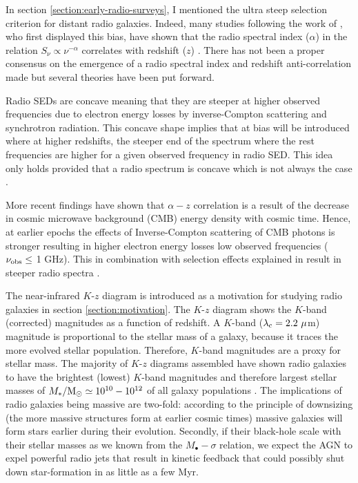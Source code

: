 \documentclass[10pt,a4paper]{article}
\begin{document}
In section \ref{section:early-radio-surveys}, I mentioned the ultra steep selection criterion for distant radio galaxies. Indeed, many studies following the work of \citet{Tielens1979}, who first displayed this bias, have shown that the radio spectral index ($\alpha$) in the relation $S_\nu \propto \nu^{-\alpha}$ correlates with redshift ($z$) \citep{BlumenthalMiley1979,Chambers1988a,deBreuck2002}. There has not been a proper consensus on the emergence of a radio spectral index and redshift anti-correlation made but several theories have been put forward. 

Radio SEDs are concave meaning that they are steeper at higher observed frequencies due to electron energy losses by inverse-Compton scattering and synchrotron radiation. This concave shape implies that at bias will be introduced where at higher redshifts, the steeper end of the spectrum where the rest frequencies are higher for a given observed frequency in radio SED. This idea only holds provided that a radio spectrum is concave which is not always the case \citep{Klamer2006}.  

More recent findings have shown that $\alpha-z$ correlation is a result of the decrease in cosmic microwave background (CMB) energy density with cosmic time. Hence, at earlier epochs the effects of Inverse-Compton scattering of CMB photons is stronger resulting in higher electron energy losses low observed frequencies ($\nu_{\rm obs} \leq$ 1 GHz). This in combination with selection effects explained in \citet{deBreuck2000} result in steeper radio spectra \citep{Morabito2018}.  

The near-infrared $K$-$z$ diagram is introduced as a motivation for studying radio galaxies in section \ref{section:motivation}. The $K$-$z$ diagram shows the $K$-band (corrected) magnitudes as a function of redshift. A $K$-band ($\lambda_{\rm c}=2.2~\mu$m) magnitude is proportional to the stellar mass of a galaxy, because it traces the more evolved stellar population. Therefore, $K$-band magnitudes are a proxy for stellar mass. The majority of $K$-$z$ diagrams assembled have shown radio galaxies to have the brightest (lowest) $K$-band magnitudes and therefore largest stellar masses of $M_*/\rm{M}_\odot \simeq 10^{10} - 10^{12}$ of all galaxy populations \citep{McCarthy1993,jarvis2001,Willott2003,rocca-volmerange2004}. The implications of radio galaxies being massive are two-fold: according to the principle of downsizing (the more massive structures form at earlier cosmic times) massive galaxies will form stars earlier during their evolution. Secondly, if their black-hole scale with their stellar masses as we known from the $M_\bullet-\sigma$ relation, we expect the AGN to expel powerful radio jets that result in kinetic feedback that could possibly shut down star-formation in as little as a few Myr. 
\end{document}

